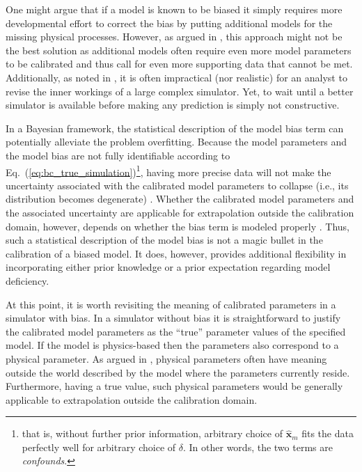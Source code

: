 One might argue that if a model is known to be biased it simply requires more developmental effort to correct the bias by putting additional models for the missing physical processes.
However, as argued in \cite{Arhonditsis2008,Wulff2007}, this approach might not be the best solution as additional models often require even more model parameters to be calibrated and thus call for even more supporting data that cannot be met.
Additionally, as noted in \cite{Campbell2006,Bayarri2007,Brynjarsdottir2014}, it is often impractical (nor realistic) for an analyst to revise the inner workings of a large complex simulator.
Yet, to wait until a better simulator is available before making any prediction is simply not constructive.

In a Bayesian framework, the statistical description of the model bias term can potentially alleviate the problem overfitting.
Because the model parameters and the model bias are not fully identifiable according to Eq.~(\ref{eq:bc_true_simulation})\footnote{that is, without further prior information, arbitrary choice of $\hat{\bm{x}}_m$ fits the data perfectly well for arbitrary choice of $\delta$. In other words, the two terms are \emph{confounds}.}, 
having more precise data will not make the uncertainty associated with the calibrated model parameters to collapse (i.e., its distribution becomes degenerate) \cite{Bayarri2007,Brynjarsdottir2014}.
Whether the calibrated model parameters and the associated uncertainty are applicable for extrapolation outside the calibration domain, however, depends on whether the bias term is modeled properly \cite{Bayarri2007,Arhonditsis2008,Arendt2012,OHagan2013,Brynjarsdottir2014,Ling2014}.
Thus, such a statistical description of the model bias is not a magic bullet in the calibration of a biased model.
It does, however, provides additional flexibility in incorporating either prior knowledge or a prior expectation regarding model deficiency.

At this point, it is worth revisiting the meaning of calibrated parameters in a simulator with bias.
In a simulator without bias it is straightforward to justify the calibrated model parameters as the ``true'' parameter values of the specified model.
If the model is physics-based then the parameters also correspond to a physical parameter.
As argued in \cite{OHagan2013,Brynjarsdottir2014}, physical parameters often have meaning outside the world described by the model where the parameters currently reside.
Furthermore, having a true value, such physical parameters would be generally applicable to extrapolation outside the calibration domain.

